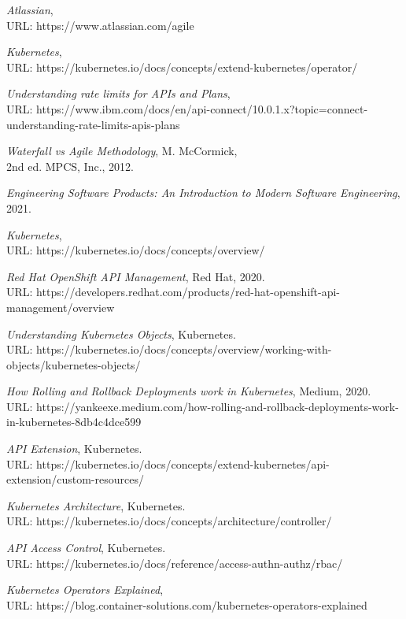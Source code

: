 \documentclass{article}
\begin{document}
\clearpage
\begin{thebibliography}{9}


\emph{Atlassian}, \\URL: https://www.atlassian.com/agile 

\emph{Kubernetes}, \\URL: https://kubernetes.io/docs/concepts/extend-kubernetes/operator/

\emph{Understanding rate limits for APIs and Plans}, \\URL: https://www.ibm.com/docs/en/api-connect/10.0.1.x?topic=connect-understanding-rate-limits-apis-plans

\emph{Waterfall vs Agile Methodology}, M. McCormick, \\2nd ed. MPCS, Inc., 2012.

\emph{Engineering Software Products: An Introduction to Modern Software Engineering}, 2021.
  
\emph{Kubernetes}, \\URL: https://kubernetes.io/docs/concepts/overview/  

\emph{Red Hat OpenShift API Management}, Red Hat, 2020. \\URL: https://developers.redhat.com/products/red-hat-openshift-api-management/overview

\emph{Understanding Kubernetes Objects}, Kubernetes. \\URL: https://kubernetes.io/docs/concepts/overview/working-with-objects/kubernetes-objects/
  
\emph{How Rolling and Rollback Deployments work in Kubernetes}, Medium, 2020. \\URL: https://yankeexe.medium.com/how-rolling-and-rollback-deployments-work-in-kubernetes-8db4c4dce599 

\emph{API Extension}, Kubernetes. \\URL: https://kubernetes.io/docs/concepts/extend-kubernetes/api-extension/custom-resources/ 
  
\emph{Kubernetes Architecture}, Kubernetes. \\URL: https://kubernetes.io/docs/concepts/architecture/controller/ 
  
\emph{API Access Control}, Kubernetes. \\ URL: https://kubernetes.io/docs/reference/access-authn-authz/rbac/  

\emph{Kubernetes Operators Explained}, \\URL: https://blog.container-solutions.com/kubernetes-operators-explained
  


\end{thebibliography}
\end{document}
